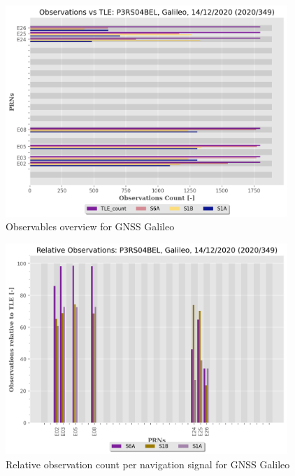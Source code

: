 \begin{figure}[H]%
\centering%
\includegraphics[width=0.95\textwidth]{png/P3RS04BEL_R_20203490000_01D_00U_MO_E-ObsTLE.png}%
\caption{\label{fig:obst_gnss_E} Observables overview for GNSS Galileo}%
\end{figure}

%


\begin{figure}[H]%
\centering%
\includegraphics[width=0.95\textwidth]{png/P3RS04BEL_R_20203490000_01D_00U_MO_E-PERC.png}%
\caption{\label{fig:prec_obst_gnss_E} Relative observation count per navigation signal for GNSS Galileo}%
\end{figure}

%
\clearpage

